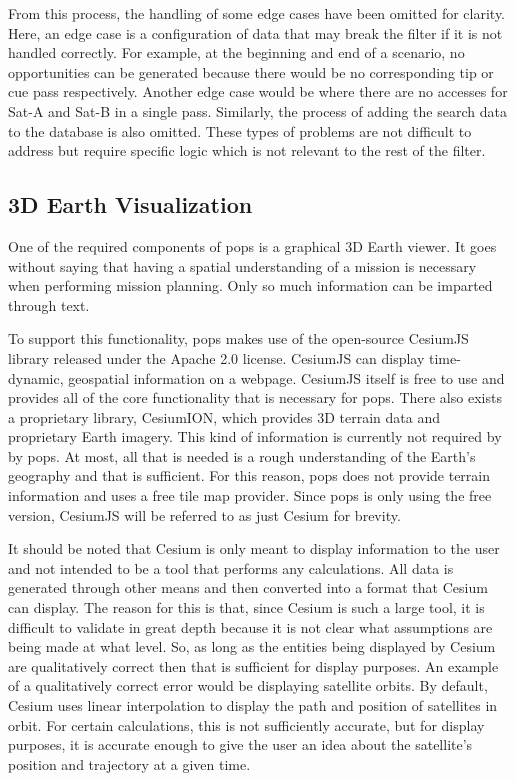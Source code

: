From this process, the handling of some edge cases have been omitted for
clarity. Here, an edge case is a configuration of data that may break the
filter if it is not handled correctly. For example, at the beginning and end of
a scenario, no opportunities can be generated because there would be no
corresponding tip or cue pass respectively. Another edge case would be where
there are no accesses for Sat-A and Sat-B in a single pass. Similarly, the
process of adding the search data to the database is also omitted. These types
of problems are not difficult to address but require specific logic which is
not relevant to the rest of the filter.

\newpage

\subsection{3D Earth Visualization}

One of the required components of \gls{pops} is a graphical 3D Earth viewer.
It goes without saying that having a spatial understanding of a mission is
necessary when performing mission planning. Only so much information can be
imparted through text.


To support this functionality, \gls{pops} makes use of the open-source CesiumJS
library released under the Apache 2.0 license. CesiumJS can display
time-dynamic, geospatial information on a webpage. CesiumJS itself is free to
use and provides all of the core functionality that is necessary for
\gls{pops}. There also exists a proprietary library, CesiumION, which provides
3D terrain data and proprietary Earth imagery. This kind of information is
currently not required by by \gls{pops}.  At most, all that is needed is a
rough understanding of the Earth's geography and that is sufficient. For this
reason, \gls{pops} does not provide terrain information and uses a free tile
map provider. Since \gls{pops} is only using the free version, CesiumJS will be
referred to as just Cesium for brevity. 

It should be noted that Cesium is only meant to display information to the user
and not intended to be a tool that performs any calculations. All data is generated
through other means and then converted into a format that Cesium can display.
The reason for this is that, since Cesium is such a large tool, it is difficult
to validate in great depth because it is not clear what assumptions are being
made at what level. So, as long as the entities being displayed by Cesium are
qualitatively correct then that is sufficient for display purposes. An example
of a qualitatively correct error would be displaying satellite orbits. By
default, Cesium uses linear interpolation to display the path and position of
satellites in orbit. For certain calculations, this is not sufficiently
accurate, but for display purposes, it is accurate enough to give the user an
idea about the satellite's position and trajectory at a given time. 

